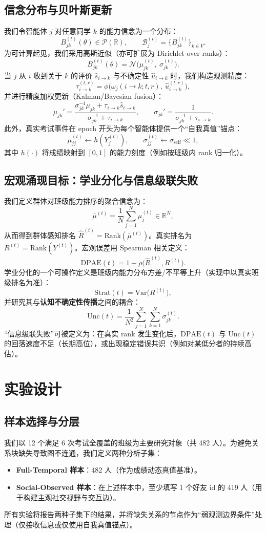 \documentclass[UTF8, a4paper, 11pt]{ctexart}
\begin{document}
\subsection{信念分布与贝叶斯更新}
我们令智能体 \(j\) 对任意同学 \(k\) 的能力信念为一个分布：
\[
B_{jk}^{(t)}(\theta) \in \mathcal{P}(\mathbb{R}),\qquad
\mathcal{B}_j^{(t)}=\{B_{jk}^{(t)}\}_{k\in V}.
\]
为可计算起见，我们采用高斯近似（亦可扩展为 Dirichlet over ranks）：
\[
B_{jk}^{(t)}(\theta)=\mathcal{N}\big(\mu_{jk}^{(t)},\ \sigma_{jk}^{(t)}\big).
\]
当 \(j\) 从 \(i\) 收到关于 \(k\) 的评价 \(\hat{s}_{i\to k}\) 与不确定性 \(\hat{u}_{i\to k}\) 时，我们构造观测精度：
\[
\tau_{i\to k}^{(t,r)} = \phi\big(\omega_j(i\to k;t,r),\ \hat{u}_{i\to k}^{(t,r)}\big),
\]
并进行精度加权更新（Kalman/Bayesian fusion）：
\[
\mu_{jk}' = \frac{\sigma_{jk}^{-1}\mu_{jk} + \tau_{i\to k}\hat{s}_{i\to k}}{\sigma_{jk}^{-1}+\tau_{i\to k}},\qquad
\sigma_{jk}' = \frac{1}{\sigma_{jk}^{-1}+\tau_{i\to k}}.
\]
此外，真实考试事件在 epoch 开头为每个智能体提供一个“自我真值”锚点：
\[
\mu_{jj}^{(t)} \leftarrow h(Y_j^{(t)}),\qquad \sigma_{jj}^{(t)} \leftarrow \sigma_{\text{self}}\ll 1,
\]
其中 \(h(\cdot)\) 将成绩映射到 \([0,1]\) 的能力刻度（例如按班级内 rank 归一化）。

\subsection{宏观涌现目标：学业分化与信息级联失败}
我们定义群体对班级能力排序的聚合信念为：
\[
\bar{\mu}^{(t)} = \frac{1}{N}\sum_{j=1}^N \mu_{j\cdot}^{(t)} \in \mathbb{R}^N,
\]
从而得到群体感知排名 \(\hat{R}^{(t)}=\text{Rank}(\bar{\mu}^{(t)})\)。真实排名为 \(R^{(t)}=\text{Rank}(Y^{(t)})\)。宏观误差用 Spearman 相关定义：
\[
\text{DPAE}(t)=1-\rho\big(\hat{R}^{(t)}, R^{(t)}\big).
\]
学业分化的一个可操作定义是班级内能力分布方差/不平等上升（实现中以真实班级排名为准）：
\[
\text{Strat}(t)=\text{Var}\big(R^{(t)}\big),
\]
并研究其与\textbf{认知不确定性传播}之间的耦合：
\[
\text{Unc}(t)=\frac{1}{N^2}\sum_{j=1}^N\sum_{k=1}^N \sigma_{jk}^{(t)}.
\]
“信息级联失败”可被定义为：在真实 rank 发生变化后，\(\text{DPAE}(t)\) 与 \(\text{Unc}(t)\) 的回落速度不足（长期高位），或出现稳定错误共识（例如对某低分者的持续高估）。

\section{实验设计}
\subsection{样本选择与分层}
我们以 12 个满足 6 次考试全覆盖的班级为主要研究对象（共 482 人）。为避免关系块缺失导致图不连通，我们定义两种分析子集：
\begin{itemize}
    \item \textbf{Full-Temporal 样本}：482 人（作为成绩动态真值基准）。
    \item \textbf{Social-Observed 样本}：在上述样本中，至少填写 1 个好友 id 的 419 人（用于构建主观社交视野与交互边）。
\end{itemize}
所有实验将报告两种子集下的结果，并将缺失关系的节点作为“弱观测边界条件”处理（仅接收信息或仅使用自我真值锚点）。
\end{document}
